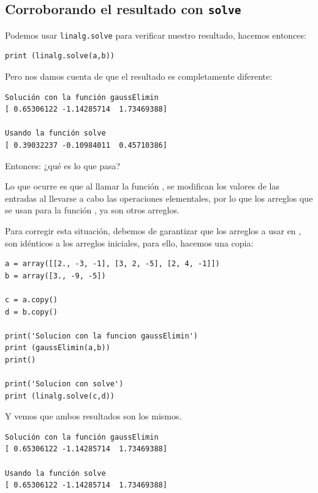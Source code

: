 \subsection*{Corroborando el resultado con \texttt{solve}}
Podemos usar \texttt{linalg.solve} para verificar nuestro resultado, hacemos entonces:
\begin{lstlisting}[caption=Usando \funcionazul{linalg.solve}, style=FormattedNumber, basicstyle=\linespread{1.1}\ttfamily=\small, columns=fullflexible]
print (linalg.solve(a,b))
\end{lstlisting}
Pero nos damos cuenta de que el resultado es completamente diferente:
\begin{verbatim}
Solución con la función gaussElimin
[ 0.65306122 -1.14285714  1.73469388]

Usando la función solve
[ 0.39032237 -0.10984011  0.45710386]
\end{verbatim}
Entonces: ¿qué es lo que pasa?
\par
Lo que ocurre es que al llamar la función , se modifican los valores de las entradas al llevarse a cabo las operaciones elementales, por lo que los arreglos que se usan para la función , ya son otros arreglos.
\par
Para corregir esta situación, debemos de garantizar que los arreglos a usar en , son idénticos a los arreglos iniciales, para ello, hacemos una copia:
\begin{lstlisting}[caption=Ajuste a la solución, style=FormattedNumber, basicstyle=\linespread{1.1}\ttfamily=\small, columns=fullflexible]	
a = array([[2., -3, -1], [3, 2, -5], [2, 4, -1]])
b = array([3., -9, -5])

c = a.copy()
d = b.copy()

print('Solucion con la funcion gaussElimin')
print (gaussElimin(a,b))
print()

print('Solucion con solve')
print (linalg.solve(c,d))
\end{lstlisting}
Y vemos que ambos resultados son los mismos.
\begin{verbatim}
Solución con la función gaussElimin
[ 0.65306122 -1.14285714  1.73469388]

Usando la función solve
[ 0.65306122 -1.14285714  1.73469388]
\end{verbatim}
